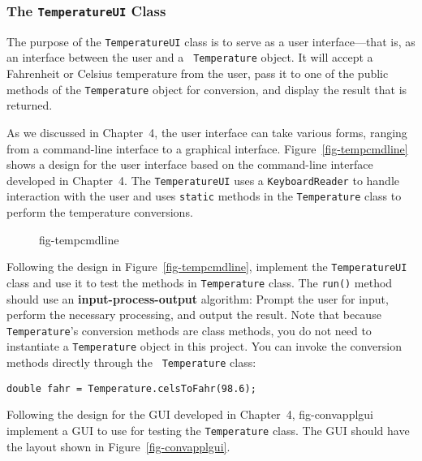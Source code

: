 

\subsubsection*{The {\tt TemperatureUI} Class}
\noindent The purpose of the {\tt TemperatureUI} class is to serve as a 
user interface---that is, as an interface between the user and a {\tt
Temperature} object.  It will accept a Fahrenheit or Celsius
temperature from the user, pass it to one of the public methods of the
{\tt Temperature} object for conversion, and display the result that
is returned. 

As we discussed in Chapter~4, the user interface can take various
forms, ranging from a command-line interface to a graphical
interface. Figure~\ref{fig-tempcmdline} shows a design for the user
interface based on the command-line interface developed in
Chapter~4. The {\tt TemperatureUI} uses a {\tt KeyboardReader} to
handle interaction with the user and uses {\tt static} methods in the
{\tt Temperature} class to perform the temperature conversions.

\begin{figure}[h!]
{fig-tempcmdline}
\end{figure}


\label{self-study-exercises}
\begin{SSTUDY}
\item  Following the design in Figure~\ref{fig-tempcmdline},
implement the {\tt TemperatureUI} class and use it to test the methods
in {\tt Temperature} class. The {\tt run()} method should use an {\bf
input-process-output} algorithm: Prompt the user for input, perform
the necessary processing, and output the result. Note that because
{\tt Temperature}'s conversion methods are class methods, you do not
need to instantiate a {\tt Temperature} object in this project. You
can invoke the conversion methods directly through the {\tt
Temperature} class:

\begin{jjjlisting}
\begin{lstlisting}
double fahr = Temperature.celsToFahr(98.6);
\end{lstlisting}
\end{jjjlisting}

\item  Following the design for the GUI developed in Chapter~4,
{fig-convapplgui}
implement a GUI to use for testing the {\tt Temperature} class.
The GUI should have the layout shown in Figure~\ref{fig-convapplgui}.
\end{SSTUDY}

